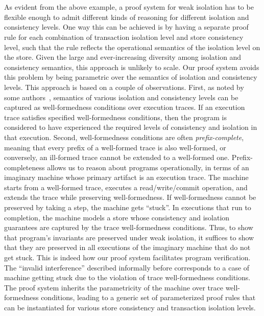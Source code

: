 \section{\txnimp}

As evident from the above example, a proof system for weak isolation
has to be flexible enough to admit different kinds of reasoning for
different isolation and consistency levels. One way this can be
achieved is by having a separate proof rule for each combination of
transaction isolation level and store consistency level, such that the
rule reflects the operational semantics of the isolation level on the
store. Given the large and ever-increasing diversity among isolation
and consistency semantics, this approach is unlikely to scale. Our
proof system avoids this problem by being parametric over the
semantics of isolation and consistency levels. This approach is based
on a couple of observations. First, as noted by some
authors~\cite{pldi15,gotsmanconcur15}, semantics of various isolation
and consistency levels can be captured as well-formedness conditions
over execution traces. If an execution trace satisfies specified
well-formedness conditions, then the program is considered to have
experienced the required levels of consistency and isolation in that
execution. Second, well-formedness conditions are often
\emph{prefix-complete}, meaning that every prefix of a well-formed
trace is also well-formed, or conversely, an ill-formed trace cannot
be extended to a well-formed one. Prefix-completeness allows us to
reason about programs operationally, in terms of an imaginary machine
whose primary artifact is an execution trace. The machine starts from
a well-formed trace, executes a read/write/commit operation, and
extends the trace while preserving well-formedness. If well-formedness
cannot be preserved by taking a step, the machine gets ``stuck''. In
executions that run to completion, the machine models a store whose
consistency and isolation guarantees are captured by the trace
well-formedness conditions. Thus, to show that program's invariants
are preserved under weak isolation, it suffices to show that they are
preserved in all executions of the imaginary machine that do not get
stuck. This is indeed how our proof system facilitates program
verification. The ``invalid interference'' described informally before
corresponds to a case of machine getting stuck due to the violation of
trace well-formedness conditions. The proof system inherits the
parametricity of the machine over trace well-formedness conditions,
leading to a generic set of parameterized proof rules that can be
instantiated for various store consistency and transaction isolation
levels.


